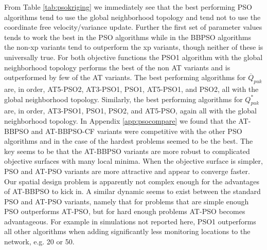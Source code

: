 \documentclass[cmbright]{staauth}
\begin{document}
From Table \ref{tab:psokriging} we immediately see that the best performing PSO algorithms tend to use the global neighborhood topology and tend not to use the coordinate free velocity/variance update. Further the first set of parameter values tends to work the best in the PSO algorithms while in the BBPSO algorithms the non-xp variants tend to outperform the xp variants, though neither of these is universally true. For both objective functions the PSO1 algorithm with the global neighborhood topology performs the best of the non AT variants and is outperformed by few of the AT variants. The best performing algorithms for $\overline{Q}_{puk}$ are, in order, AT5-PSO2, AT3-PSO1, PSO1, AT5-PSO1, and PSO2, all with the global neighborhood topology. Similarly, the best performing algorithms for $Q^*_{puk}$ are, in order, AT3-PSO1, PSO1, PSO2, and AT5-PSO, again all with the global neighborhood topology. In Appendix \ref{app:psocompare} we found that the AT-BBPSO and AT-BBPSO-CF variants were competitive with the other PSO algorithms and in the case of the hardest problems seemed to be the best. The key seems to be that the AT-BBPSO variants are more robust to complicated objective surfaces with many local minima. When the objective surface is simpler, PSO and AT-PSO variants are more attractive and appear to converge faster. Our spatial design problem is apparently not complex enough for the advantages of AT-BBPSO to kick in. A similar dynamic seems to exist between the standard PSO and AT-PSO variants, namely that for problems that are simple enough PSO outperforms AT-PSO, but for hard enough problems AT-PSO becomes advantageous. For example in simulations not reported here, PSO1 outperforms all other algorithms when adding significantly less monitoring locations to the network, e.g. 20 or 50.
\end{document}
